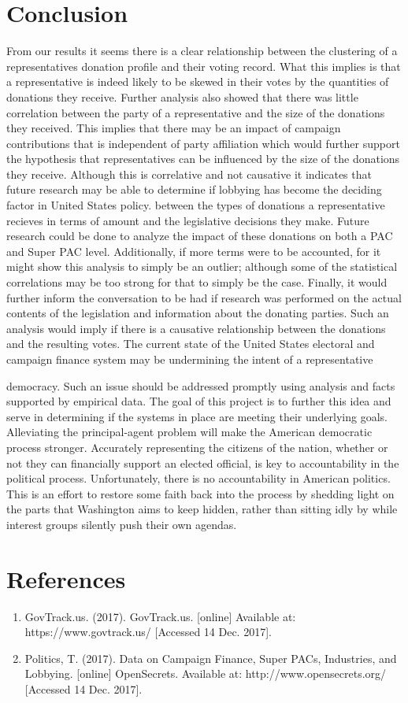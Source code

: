 \documentclass[journal]{IEEEtran}
\begin{document}
\section{Conclusion}
From our results it seems there is a clear relationship between the clustering of a representatives donation profile and their voting
record. What this implies is that a representative is indeed likely to be skewed in their votes by the quantities of donations they receive.
Further analysis also showed that there was little correlation between the party of a representative and the size of the donations they
received. This implies that there may be an impact of campaign contributions that is independent of party affiliation which would further
support the hypothesis that representatives can be influenced by the size of the donations they receive. Although this is correlative and
not causative it indicates that future research may be able to determine if lobbying has become the deciding factor in United States policy.
between the types of donations a representative recieves in terms of amount and the legislative decisions they make.
Future research could be done to analyze the impact of these donations on both a PAC and Super PAC level. Additionally, if more terms 
were to be accounted, for it might show this analysis to simply be an outlier; although some of the statistical correlations may be too 
strong for that to simply be the case. Finally, it would further inform the conversation to be had if research was performed on the actual 
contents of the legislation and information about the donating parties. Such an analysis would imply if there is a causative 
relationship between the donations and the resulting votes.
The current state of the United States electoral and campaign finance system may be undermining the intent of a representative

democracy. Such an issue should be addressed promptly using analysis and facts supported by empirical data. The goal of this project
is to further this idea and serve in determining if the systems in place are meeting their underlying goals.
Alleviating the principal-agent problem will make the American democratic process stronger. Accurately representing the citizens 
of the nation, whether or not they can financially support an elected official, is key to accountability in the political process. 
Unfortunately, there is no accountability in American politics. This is an effort to restore some faith back into the process by 
shedding light on the parts that Washington aims to keep hidden, rather than sitting idly by while interest groups silently push 
their own agendas.
\section{References}
\begin{enumerate}
 \item GovTrack.us. (2017). GovTrack.us. [online] Available at: https://www.govtrack.us/ [Accessed 14 Dec. 2017].
  \item Politics, T. (2017). Data on Campaign Finance, Super PACs, Industries, and Lobbying. [online] OpenSecrets. Available at: http://www.opensecrets.org/ [Accessed 14 Dec. 2017].

\end{enumerate}
\end{document}
